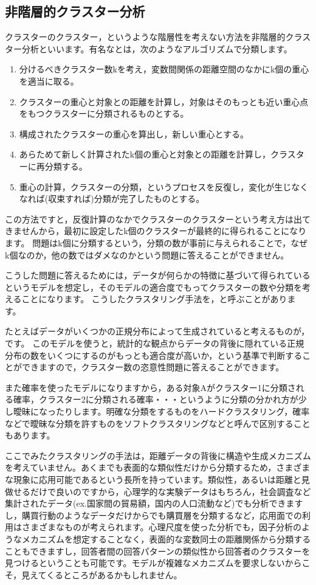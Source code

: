 \documentclass{ltjsbook}
\begin{document}
\subsection{非階層的クラスター分析}
クラスターのクラスター，というような階層性を考えない方法を非階層的クラスター分析といいます。有名なとは，次のようなアルゴリズムで分類します。
\begin{enumerate}
    \item 分けるべきクラスター数kを考え，変数間関係の距離空間のなかにk個の重心を適当に取る。
    \item クラスターの重心と対象との距離を計算し，対象はそのもっとも近い重心点をもつクラスターに分類されるものとする。
    \item 構成されたクラスターの重心を算出し，新しい重心とする。
    \item あらためて新しく計算されたk個の重心と対象との距離を計算し，クラスターに再分類する。
    \item 重心の計算，クラスターの分類，というプロセスを反復し，変化が生じなくなれば(収束すれば)分類が完了したものとする。
\end{enumerate}
この方法ですと，反復計算のなかでクラスターのクラスターという考え方は出てきませんから，最初に設定したk個のクラスターが最終的に得られることになります。
問題はk個に分類するという，分類の数が事前に与えられることで，なぜk個なのか，他の数ではダメなのかという問題に答えることができません。

こうした問題に答えるためには，データが何らかの特徴に基づいて得られているというモデルを想定し，そのモデルの適合度でもってクラスターの数や分類を考えることになります。
こうしたクラスタリング手法を，と呼ぶことがあります。

たとえばデータがいくつかの正規分布によって生成されていると考えるものが，です。
このモデルを使うと，統計的な観点からデータの背後に隠れている正規分布の数をいくつにするのがもっとも適合度が高いか，という基準で判断することができますので，クラスター数の恣意性問題に答えることができます。

また確率を使ったモデルになりますから，ある対象Aがクラスター1に分類される確率，クラスター2に分類される確率・・・というように分類の分かれ方が少し曖昧になったりします。明確な分類をするものをハードクラスタリング，確率などで曖昧な分類を許すものをソフトクラスタリングなどと呼んで区別することもあります。


ここでみたクラスタリングの手法は，距離データの背後に構造や生成メカニズムを考えていません。あくまでも表面的な類似性だけから分類するため，さまざまな現象に応用可能であるという長所を持っています。類似性，あるいは距離と見做せるだけで良いのですから，心理学的な実験データはもちろん，社会調査など集計されたデータ(ex.国家間の貿易額，国内の人口流動など)でも分析できますし，購買行動のようなデータだけからでも購買層を分類するなど，応用面での利用はさまざまなものが考えられます。心理尺度を使った分析でも，因子分析のようなメカニズムを想定することなく，表面的な変数同士の距離関係から分類することもできますし，回答者間の回答パターンの類似性から回答者のクラスターを見つけるということも可能です。モデルが複雑なメカニズムを要求しないからこそ，見えてくるところがあるかもしれません。
\end{document}
